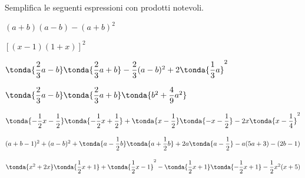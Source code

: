 \begin{esercizio}[*]
\label{ese:11.22}
Semplifica le seguenti espressioni con prodotti notevoli.

\begin{enumeratea}
\spazielenx
\item \((a+b)(a-b)-(a+b)^{2}\)
\item \([(x-1)(1+x)]^{2}\)
\item 
\(\tonda{\dfrac{2}{3}a-b}\tonda{\dfrac{2}{3}a+b}-\dfrac{2}{3}(a-b)^{ 2} +
2\tonda{\dfrac{1}{3}a}^{2}\)
%  
% 
% 
%  
% 
% 
% 
% 


\item \(\tonda{\dfrac{2}{3}a-b}\tonda{\dfrac{2}{3}a+b}
      \tonda{b^{2}+\dfrac{4}{9}a^{2}}\)
\item \(\tonda{-{\dfrac{1}{2}x-\dfrac{1}{2}}}
      \tonda{-\dfrac{1}{2}x+\dfrac{1}{2}}+
      \tonda{x-\dfrac{1}{2}}\tonda{-x-\dfrac{1}{2}}-
      2x\tonda{x-\dfrac{1}{4}}^{2}\)
\item \((a+b-1)^{2}+(a-b)^{2}+\tonda{a-\dfrac{1}{2}b}
      \tonda{a+\dfrac{1}{2}b}+2a\tonda{a-\dfrac{1}{2}}-
      a(5a+3)-(2b-1)\) \\
\item \(\tonda{x^{2}+2x}
      \tonda{\dfrac{1}{2}x+1}+\tonda{\dfrac{1}{2}x-1}^{2}-
      \tonda{\dfrac{1}{2}x+1}
      \tonda{-{\dfrac{1}{2}}x+1}-\dfrac{1}{2}x^{2}(x+5)\)
\end{enumeratea}
\end{esercizio}


